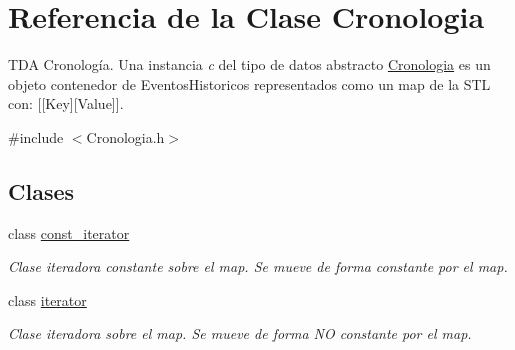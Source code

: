 \hypertarget{classCronologia}{}\section{Referencia de la Clase Cronologia}
\label{classCronologia}


T\+DA Cronología. Una instancia {\itshape c} del tipo de datos abstracto {\ttfamily \hyperlink{classCronologia}{Cronologia}} es un objeto contenedor de Eventos\+Historicos representados como un map de la S\+TL con\+: \mbox{[}\mbox{[}Key\mbox{]}\mbox{[}Value\mbox{]}\mbox{]}.  




{\ttfamily \#include $<$Cronologia.\+h$>$}

\subsection*{Clases}
\begin{DoxyCompactItemize}
\item 
class \hyperlink{classCronologia_1_1const__iterator}{const\+\_\+iterator}
\begin{DoxyCompactList}\small\item\em Clase iteradora constante sobre el map. Se mueve de forma constante por el map. \end{DoxyCompactList}\item 
class \hyperlink{classCronologia_1_1iterator}{iterator}
\begin{DoxyCompactList}\small\item\em Clase iteradora sobre el map. Se mueve de forma NO constante por el map. \end{DoxyCompactList}\end{DoxyCompactItemize}
